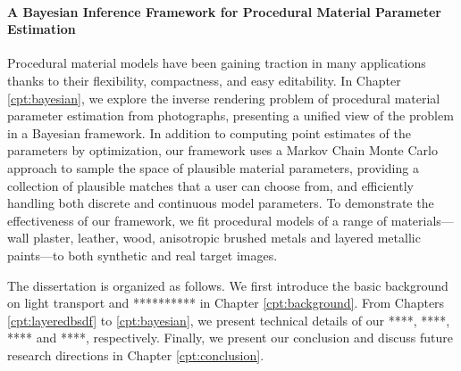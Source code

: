 \paragraph{A Bayesian Inference Framework for Procedural Material Parameter Estimation}
Procedural material models have been gaining traction in many applications thanks to their flexibility, compactness, and easy editability.
In Chapter \ref{cpt:bayesian}, we explore the inverse rendering problem of procedural material parameter estimation from photographs, presenting a unified view of the problem in a Bayesian framework. In addition to computing point estimates of the parameters by optimization, our framework uses a Markov Chain Monte Carlo approach to sample the space of plausible material parameters, providing a collection of plausible matches that a user can choose from, and efficiently handling both discrete and continuous model parameters. To demonstrate the effectiveness of our framework, we fit procedural models of a range of materials---wall plaster, leather, wood, anisotropic brushed metals and layered metallic paints---to both synthetic and real target images.

The dissertation is organized as follows. We first introduce the basic background on light transport and ********** in Chapter \ref{cpt:background}. From Chapters \ref{cpt:layeredbsdf} to \ref{cpt:bayesian}, we present technical details of our ****, ****, **** and ****, respectively. Finally, we present our conclusion and discuss future research directions in Chapter \ref{cpt:conclusion}.